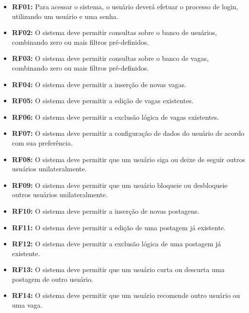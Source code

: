 \documentclass[cic,tc]{iiufrgs}
\begin{document}
\begin{itemize}
    \item \textbf{RF01:} Para acessar o sistema, o usuário deverá efetuar o processo de login, utilizando um usuário e uma senha.
    
    \item \textbf{RF02:} O sistema deve permitir consultas sobre o banco de usuários, combinando zero ou mais filtros pré-definidos.
    
    \item \textbf{RF03:} O sistema deve permitir consultas sobre o banco de vagas, combinando zero ou mais filtros pré-definidos.
    
    \item \textbf{RF04:} O sistema deve permitir a inserção de novas vagas.
    
    \item \textbf{RF05:} O sistema deve permitir a edição de vagas existentes.
    
    \item \textbf{RF06:} O sistema deve permitir a exclusão lógica de vagas existentes.
    
    \item \textbf{RF07:} O sistema deve permitir a configuração de dados do usuário de acordo com sua preferência.
    
    \item \textbf{RF08:} O sistema deve permitir que um usuário siga ou deixe de seguir outros usuários unilateralmente.
    
    \item \textbf{RF09:} O sistema deve permitir que um usuário bloqueie ou desbloqueie outros usuários unilateralmente.
    
    \item \textbf{RF10:} O sistema deve permitir a inserção de novas postagens.
    
    \item \textbf{RF11:} O sistema deve permitir a edição de uma postagem já existente.
    
    \item \textbf{RF12:} O sistema deve permitir a exclusão lógica de uma postagem já existente.
    
    \item \textbf{RF13:} O sistema deve permitir que um usuário curta ou descurta uma postagem de outro usuário. 
    
    \item \textbf{RF14:} O sistema deve permitir que um usuário recomende outro usuário ou uma vaga.
\end{itemize}
\end{document}
